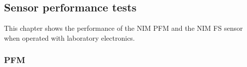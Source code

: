 		
	\subsection{Sensor performance tests}
		This chapter shows the performance of the NIM PFM and the NIM FS sensor when operated with laboratory electronics.
		
		\subsubsection{PFM}\label{sec:paper}
		
		\newpage
